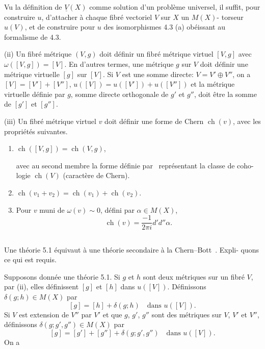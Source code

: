 \documentclass[12pt,a4paper]{article}
\theoremstyle{plain}
\theoremstyle{definition}
\DeclareMathOperator{\ch}{ch}
\begin{document}
Vu la d\'efinition de $\underline{V}(X)$ comme solution d'un probl\`eme universel, il suffit,
pour construire $u$, d'attacher \`a chaque fibr\'e vectoriel $V$ sur $X$ un $M(X)$-
torseur $u(V)$, et de construire pour $u$ des isomorphismes 4.3 (a) ob\'eissant
au formalisme de 4.3.

\medskip

(ii) Un fibr\'e m\'etrique $(V, g)$ doit d\'efinir un fibr\'e m\'etrique virtuel $[V, g]$
avec $\omega([V, g]) = [V]$. En d'autres termes, une m\'etrique $g$ sur $V$ doit d\'efinir
une m\'etrique virtuelle $[g]$ sur $[V]$. Si $V$ est une somme directe: $V = V' \oplus V''$,
on a $[V] = [V'] + [V'']$, $u([V]) = u([V']) + u([V''])$ et la m\'etrique virtuelle
d\'efinie par $g$, somme directe orthogonale de $g'$ et $g''$, doit \^etre la somme
de $[g']$ et $[g'']$.

\medskip

(iii) Un fibr\'e m\'etrique virtuel $v$ doit d\'efinir une forme de Chern $\ch(v)$,
avec les propri\'et\'es suivantes.

\begin{enumerate}[label=(\alph*)]
\item $\ch([V, g]) = \ch(V, g)$,

avec au second membre la forme d\'efinie par~\cite{4} repr\'esentant la classe de coho-
logie $\ch(V)$ (caract\`ere de Chern).

\item $\ch(v_1 + v_2) = \ch(v_1) + \ch(v_2)$.

\item Pour $v$ muni de $\omega(v) \sim 0$, d\'efini par $\alpha \in M(X)$,
\[
\ch(v) = \frac{-1}{2\pi i} d'd'' \alpha .
\]
\end{enumerate}

\subsection{}

Une th\'eorie 5.1 \'equivaut \`a une th\'eorie secondaire \`a la Chern--Bott~\cite{4}. Expli-
quons ce qui est requis.

Supposons donn\'ee une th\'eorie 5.1. Si $g$ et $h$ sont deux m\'etriques sur
un fibr\'e $V$, par (ii), elles d\'efinissent $[g]$ et $[h]$ dans $u([V])$. D\'efinissons
$\delta(g; h) \in M(X)$ par
\begin{equation}\label{eq:5.2.1}
[g] = [h] + \delta(g; h) \quad \text{dans } u([V]) .
\end{equation}
Si $V$ est extension de $V''$ par $V'$ et que $g$, $g'$, $g''$ sont des m\'etriques
sur $V$, $V'$ et $V''$, d\'efinissons $\delta(g; g', g'') \in M(X)$ par
\begin{equation}\label{eq:5.2.2}
[g] = [g'] + [g''] + \delta(g; g', g'') \quad \text{dans } u([V]) .
\end{equation}
On a
\end{document}
